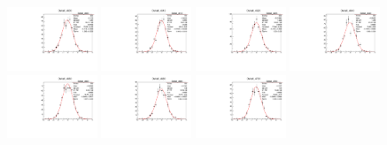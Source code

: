 \begin{figure}[h]\centering
    \includegraphics[width=0.24\textwidth]{figure/io_wo_bkg/polarization/pull_polarization_delta0_4600.pdf}
    \includegraphics[width=0.24\textwidth]{figure/io_wo_bkg/polarization/pull_polarization_delta0_4612.pdf}
    \includegraphics[width=0.24\textwidth]{figure/io_wo_bkg/polarization/pull_polarization_delta0_4626.pdf}
    \includegraphics[width=0.24\textwidth]{figure/io_wo_bkg/polarization/pull_polarization_delta0_4640.pdf}
    \includegraphics[width=0.24\textwidth]{figure/io_wo_bkg/polarization/pull_polarization_delta0_4660.pdf}
    \includegraphics[width=0.24\textwidth]{figure/io_wo_bkg/polarization/pull_polarization_delta0_4680.pdf}
    \includegraphics[width=0.24\textwidth]{figure/io_wo_bkg/polarization/pull_polarization_delta0_4700.pdf}

\end{figure}
